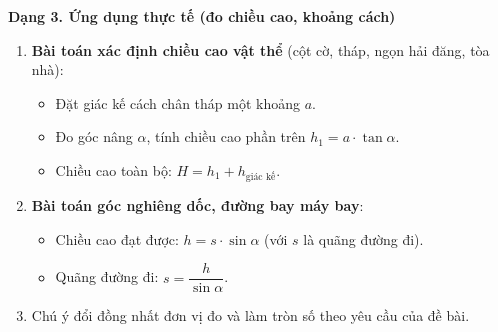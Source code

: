 \textbf{Dạng 3. Ứng dụng thực tế (đo chiều cao, khoảng cách)}
\begin{enumerate}
\item \textbf{Bài toán xác định chiều cao vật thể} (cột cờ, tháp, ngọn hải đăng, tòa nhà):
\begin{itemize}
\item Đặt giác kế cách chân tháp một khoảng $a$.
\item Đo góc nâng $\alpha$, tính chiều cao phần trên $h_1 = a \cdot \tan \alpha$.
\item Chiều cao toàn bộ: $H = h_1 + h_{\text{giác kế}}$.
\end{itemize}
\item \textbf{Bài toán góc nghiêng dốc, đường bay máy bay}:
\begin{itemize}
\item Chiều cao đạt được: $h = s \cdot \sin \alpha$ (với $s$ là quãng đường đi).
\item Quãng đường đi: $s = \dfrac{h}{\sin \alpha}$.
\end{itemize}
\item Chú ý đổi đồng nhất đơn vị đo và làm tròn số theo yêu cầu của đề bài.
\end{enumerate}
